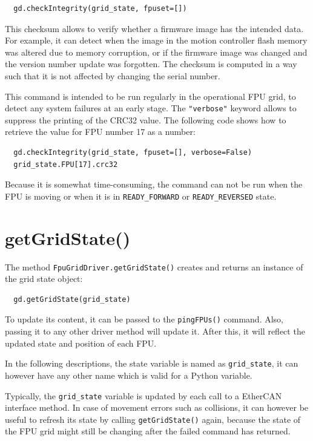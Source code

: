 \documentclass[fontsize=12,a4paper]{scrreprt}
\begin{document}
\begin{verbatim}
  gd.checkIntegrity(grid_state, fpuset=[])
\end{verbatim}

This checksum allows to verify whether a firmware image has the
intended data. For example, it can detect when the image in the motion
controller flash memory was altered due to memory corruption, or if
the firmware image was changed and the version number update was
forgotten. The checksum is computed in a way such that it is not
affected by changing the serial number.

This command is intended to be run regularly in the operational FPU
grid, to detect any system failures at an early stage.
The \texttt{"verbose"} keyword allows to suppress the printing
of the CRC32 value. The following code shows how to
retrieve the value for FPU number 17 as a number:

\begin{verbatim}
  gd.checkIntegrity(grid_state, fpuset=[], verbose=False)
  grid_state.FPU[17].crc32
\end{verbatim}


Because it is somewhat time-consuming, the command can not be run when
the FPU is moving or when it is in \texttt{READY\_FORWARD} or
\texttt{READY\_REVERSED} state.

\section{getGridState()}
The method \texttt{FpuGridDriver.getGridState()} creates and returns
an instance of the grid state object:

\begin{verbatim}
  gd.getGridState(grid_state)
\end{verbatim}

To update its content, it can be passed to the \texttt{pingFPUs()}
command. Also, passing it to any other driver method will update
it. After this, it will reflect the updated state and position of each
FPU.

In the following descriptions, the state variable is named as
\texttt{grid\_state}, it can however have any other name which is
valid for a Python variable.

Typically, the \texttt{grid\_state} variable is updated by each call
to a EtherCAN interface method. In case of movement errors such as collisions, it
can however be useful to refresh its state by calling
\texttt{getGridState()} again, because the state of the FPU grid might
still be changing after the failed command has returned.
\end{document}

